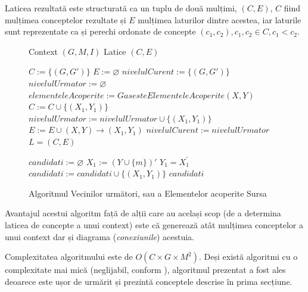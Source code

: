 \documentclass[12pt, a4paper, twoside, romanian]{teza-upb}
\begin{document}
    Laticea rezultată este structurată ca un tuplu de două mulțimi, $(C, E)$, $C$ fiind mulțimea conceptelor rezultate și $E$ mulțimea laturilor dintre acestea, iar laturile sunt reprezentate ca și perechi ordonate de concepte $(c_1, c_2), c_1, c_2 \in C, c_1 < c_2$.

    \begin{figure}[h!]
      \begin{algorithmic}[1]
        \Require Context $(G, M, I)$
        \Ensure Latice $(C, E)$

          \State $C := \{(G, G')\}$
          \State $E := \varnothing$
          \State $nivelulCurent := \{(G, G')\}$
            \State $nivelulUrmator := \varnothing$
              \State $elementeleAcoperite  := GasesteElementeleAcoperite(X, Y)$
                  \State $C := C \cup \{(X_1, Y_1)\}$
                  \State $nivelulUrmator := nivelulUrmator \cup \{ (X_1, Y_1) \}$
                \EndIf
                \State $E := E \cup (X, Y) \rightarrow (X_1, Y_1)$
              \EndFor
            \EndFor
            \State $nivelulCurent := nivelulUrmator$
          \EndWhile
          \State \Return $L = (C, E)$
        \EndFunction
        
          \State $candidati := \varnothing$
            \State $X_1 := (Y \cup \{m\})'$
            \State $Y_1 = X_{1}^{'}$
            \State $candidati := candidati \cup \{(X_1, Y_1)\}$
            \EndIf
          \EndFor
          \State \Return $candidati$
        \EndFunction
      \end{algorithmic}
      \caption{Algoritmul Vecinilor următori, sau a Elementelor acoperite Sursa \cite{Carpineto:2004:CDA:975252}}
      \label{figure:next-neighbors-algorithm}
    \end{figure}

    Avantajul acestui algoritm față de alții care au același scop (de a determina laticea de concepte a unui context) este că generează atât mulțimea conceptelor a unui context  dar și diagrama (\textit{conexiunile}) acestuia.

    Complexitatea algoritmului este de $O(C \times G \times M^2)$. Deși există algoritmi cu o complexitate mai mică (neglijabil, conform \cite{Carpineto:2004:CDA:975252}), algoritmul prezentat a fost ales deoarece este ușor de urmărit și prezintă conceptele descrise în prima secțiune.
\end{document}
